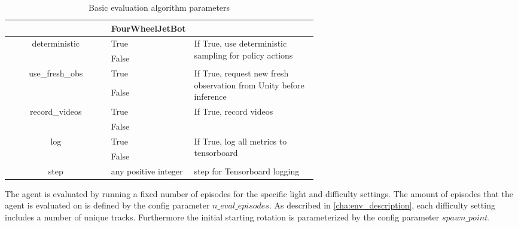 \begin{table}
\begin{center}
\begin{tabular}{|| c | p{0.20\linewidth} | p{0.4\linewidth} ||}
                                               & FourWheelJetBot      &                                                                                              \\
            \hline
            \multirow{2}{*}{deterministic}     & True                 & \multirow{2}{\linewidth}{If True, use deterministic sampling for policy actions}             \\\cline{2-2}
                                               & False                &                                                                                              \\
            \hline
            \multirow{2}{*}{use\_fresh\_obs}   & True                 & \multirow{2}{\linewidth}{If True, request new fresh observation from Unity before inference} \\\cline{2-2}
                                               & False                &                                                                                              \\
            \hline
            \multirow{2}{*}{record\_videos}    & True                 & \multirow{2}{\linewidth}{If True, record videos}                                             \\\cline{2-2}
                                               & False                &                                                                                              \\
            \hline
            \multirow{2}{*}{log}               & True                 & \multirow{2}{\linewidth}{If True, log all metrics to tensorboard}                            \\\cline{2-2}
                                               & False                &                                                                                              \\
            \hline
            \multirow{1}{*}{step}              & any positive integer & step for Tensorboard logging                                                                 \\
            \hline
        \end{tabular}
    \end{center}
    \caption{Basic evaluation algorithm parameters}
    \label{table:basic_eval_algorithm_parameters}
\end{table}



The agent is evaluated by running a fixed number of episodes for the specific light and difficulty settings. The amount of episodes that the agent is evaluated on is defined by the config parameter $n\_eval\_episodes$. As described in \ref{cha:env_description}, each difficulty setting includes a number of unique tracks. Furthermore the initial starting rotation is parameterized by the config parameter $spawn\_point$.

